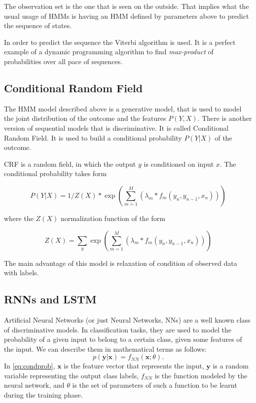 The observation set is the one that is seen on the outside. That implies what the usual usage of HMMs is having an HMM defined by parameters above to predict the sequence of states.

In order to predict the sequence the Viterbi algorithm is used. It is a perfect example of a dynamic programming algorithm to find \textit{max-product} of probabilities over all pace of sequences.

\subsection{Conditional Random Field}

The HMM model described above is a generative model, that is used to model the joint distribution of the outcome and the features $P(Y,X)$. There is another version of sequential models that is discriminative. It is called Conditional Random Field. It is used to build a conditional probability $P(Y|X)$ of the outcome.

CRF is a random field, in which the output $y$ is conditioned on input $x$. The conditional probability takes form

\[P(Y|X)=1/Z(X) * \exp(\sum_{m=1}^{M}{(\lambda_m * f_m (y_n, y_{n-1}, x_n))})\]

where the $Z(X)$ normalization function of the form 

\[Z(X)=\sum_{y}{\exp(\sum_{m=1}^{M}{(\lambda_m * f_m (y_n, y_{n-1}, x_n))})}\]

The main advantage of this model is relaxation of condition of observed data with labels. 




\subsection{RNNs and LSTM}
Artificial Neural Networks (or just Neural Networks, NNs) are a well
known class of discriminative models. In classification tasks, they are
used to model the probability of a given input to belong to a certain
class, given some features of the input. We can describe them in
mathematical terms as follows:
%
\begin{equation}
  \label{eq:condprob}
  p(\mathbf{y}|\mathbf{x}) = f_{\mathit{NN}}(\mathbf{x}; \theta).
\end{equation}
%
In \eqref{eq:condprob}, $\mathbf{x}$ is the feature vector that represents the input,
$\mathbf{y}$ is a random variable representing the output class
labels, $f_{\mathit{NN}}$ is the function modeled by the neural network, and
$\theta$ is the set of parameters of such a function to be learnt during
the training phase.


